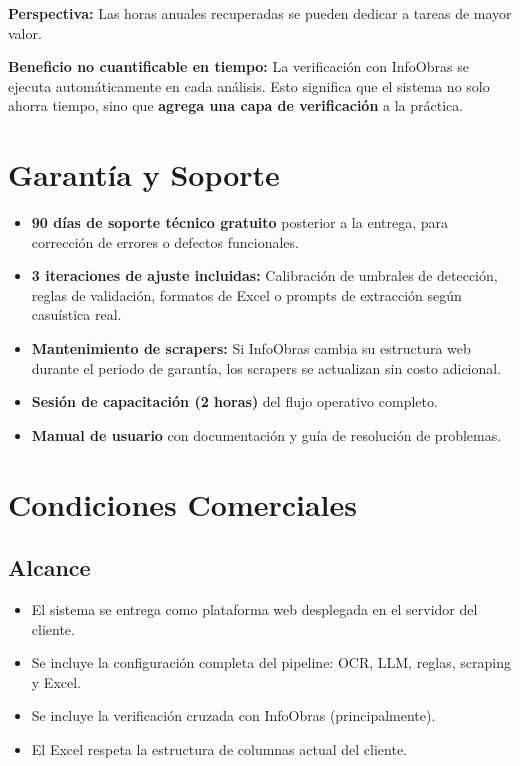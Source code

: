 \documentclass[11pt,a4paper]{article}
\begin{document}
\textbf{Perspectiva:} Las horas anuales recuperadas se pueden dedicar a tareas de mayor valor.

\textbf{Beneficio no cuantificable en tiempo:} La verificación con InfoObras se ejecuta automáticamente en cada análisis. Esto significa que el sistema no solo ahorra tiempo, sino que \textbf{agrega una capa de verificación} a la práctica.












\section{Garantía y Soporte}

\begin{itemize}[leftmargin=*]
    \item \textbf{90 días de soporte técnico gratuito} posterior a la entrega, para corrección de errores o defectos funcionales.
    \item \textbf{3 iteraciones de ajuste incluidas:} Calibración de umbrales de detección, reglas de validación, formatos de Excel o prompts de extracción según casuística real.
    \item \textbf{Mantenimiento de scrapers:} Si InfoObras cambia su estructura web durante el periodo de garantía, los scrapers se actualizan sin costo adicional.
    \item \textbf{Sesión de capacitación (2 horas)} del flujo operativo completo.
    \item \textbf{Manual de usuario} con documentación y guía de resolución de problemas.
\end{itemize}

\section{Condiciones Comerciales}

\subsection{Alcance}
\begin{itemize}[leftmargin=*]
    \item El sistema se entrega como plataforma web desplegada en el servidor del cliente.
    \item Se incluye la configuración completa del pipeline: OCR, LLM, reglas, scraping y Excel.
    \item Se incluye la verificación cruzada con InfoObras (principalmente).
    \item El Excel respeta la estructura de columnas actual del cliente.
\end{itemize}
\end{document}
